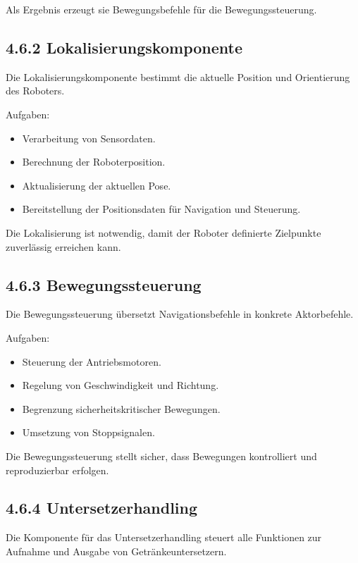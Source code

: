 \documentclass[
  a4paper,
  12pt,
  DIV=12,        %
  parskip=half,  %
  headings=small %
]{scrartcl}
\theoremstyle{definition}
\providecommand{\tightlist}{%
  \setlength{\itemsep}{0pt}\setlength{\parskip}{0pt}}
\theoremstyle{definition}
\providecommand{\tightlist}{%
  \setlength{\itemsep}{0pt}\setlength{\parskip}{0pt}}
\begin{document}
Als Ergebnis erzeugt sie Bewegungsbefehle für die Bewegungssteuerung.

\subsection{4.6.2
Lokalisierungskomponente}\label{lokalisierungskomponente-1}

Die Lokalisierungskomponente bestimmt die aktuelle Position und
Orientierung des Roboters.

Aufgaben:

\begin{itemize}
\tightlist
\item
  Verarbeitung von Sensordaten.
\item
  Berechnung der Roboterposition.
\item
  Aktualisierung der aktuellen Pose.
\item
  Bereitstellung der Positionsdaten für Navigation und Steuerung.
\end{itemize}

Die Lokalisierung ist notwendig, damit der Roboter definierte Zielpunkte
zuverlässig erreichen kann.

\subsection{4.6.3 Bewegungssteuerung}\label{bewegungssteuerung-1}

Die Bewegungssteuerung übersetzt Navigationsbefehle in konkrete
Aktorbefehle.

Aufgaben:

\begin{itemize}
\tightlist
\item
  Steuerung der Antriebsmotoren.
\item
  Regelung von Geschwindigkeit und Richtung.
\item
  Begrenzung sicherheitskritischer Bewegungen.
\item
  Umsetzung von Stoppsignalen.
\end{itemize}

Die Bewegungssteuerung stellt sicher, dass Bewegungen kontrolliert und
reproduzierbar erfolgen.

\subsection{4.6.4 Untersetzerhandling}\label{untersetzerhandling-1}

Die Komponente für das Untersetzerhandling steuert alle Funktionen zur
Aufnahme und Ausgabe von Getränkeuntersetzern.
\end{document}
